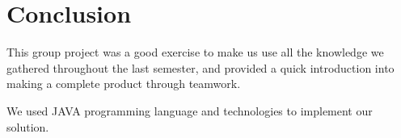 \documentclass[10pt,a4paper]{report}
\begin{document}
\chapter{Conclusion}
This group project was a good exercise to make us use all the knowledge we gathered throughout the last semester, and provided a quick introduction into making a complete product through teamwork.

We used JAVA programming language and technologies to implement our solution.

\begin{flushleft}
	
	
\end{flushleft}
\end{document}
